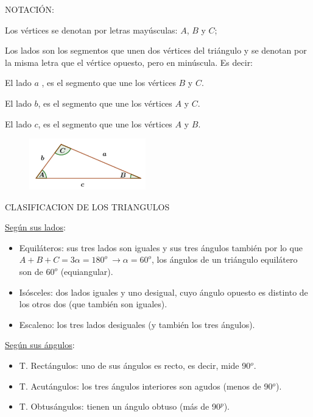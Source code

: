 \vspace{2mm}
NOTACIÓN:

Los vértices se denotan por letras mayúsculas:  $A$, $B$ y $C$;

Los lados son  los segmentos que unen dos vértices del triángulo y se denotan por la misma letra que el vértice opuesto, pero en minúscula. Es decir:
\begin{multicols}{2}


El lado $a$ , es el segmento que une los vértices $B$ y $C$.

El lado $b$, es el segmento  que une los vértices $A$ y $C$.

El lado $c$,  es el segmento que une los vértices $A$ y $B$.

\begin{figure}[H]
	\centering
	\includegraphics[width=0.45\textwidth]{img-triang/triang01.png}
\end{figure}
\end{multicols}



CLASIFICACION DE LOS TRIANGULOS

\underline{Según sus lados}:

\begin{itemize}
\item Equiláteros: sus tres lados son iguales y sus tres ángulos también por lo que $A+B+C=3\alpha=180^o \ \to \alpha=60^o$, los ángulos de un triángulo equilátero son de $60^o$ (equiangular).
\item Isósceles: dos lados iguales y uno desigual, cuyo ángulo opuesto es distinto de los otros dos (que también son iguales).
\item Escaleno: los tres lados desiguales (y también los tres ángulos).
\end{itemize}

\underline{Según sus ángulos}:
\begin{itemize}
\item T. Rectángulos: uno de sus ángulos es recto, es decir, mide 90$^o$.
\item T. Acutángulos: los tres ángulos interiores son agudos (menos de 90$^o$).
\item T. Obtusángulos: tienen un ángulo obtuso (más de 90$^p$).
\end{itemize}

